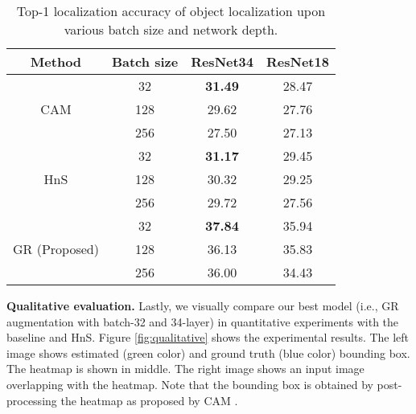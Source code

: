 \documentclass{bmvc2k}
\begin{document}
\begin{table}[t]
\centering
\begin{footnotesize}
\begin{tabular}{cc|cc}
\hline
Method                    & Batch size & ResNet34          & ResNet18          \\ \hline
\multirow{3}{*}{CAM \cite{zhou2016learning}} & 32         & \textbf{31.49}    & 28.47             \\
                          & 128        & 29.62             & 27.76             \\
                          & 256        & 27.50             & 27.13             \\ \hline
\multirow{3}{*}{HnS \cite{singh2017hide}} & 32         & \textbf{31.17}    & 29.45             \\
                          & 128        & 30.32             & 29.25             \\
                          & 256        & 29.72             & 27.56             \\ \hline
\multirow{3}{*}{GR (Proposed)}  & 32         & \textbf{37.84}    & 35.94             \\
                          & 128        & 36.13             & 35.83             \\
                          & 256        & 36.00             & 34.43             \\ \hline
\end{tabular}
\end{footnotesize}
\caption{Top-1 localization accuracy of object localization upon various batch size and network depth.}
\label{tab:learning}
\end{table}

\textbf{Qualitative evaluation.} Lastly, we visually compare our best model (i.e., GR augmentation with batch-32 and 34-layer) in quantitative experiments with the baseline and HnS. Figure \ref{fig:qualitative} shows the experimental results. The left image shows estimated (green color) and ground truth (blue color) bounding box. The heatmap is shown in middle. The right image shows an input image overlapping with the heatmap. Note that the bounding box is obtained by post-processing the heatmap as proposed by CAM \cite{zhou2016learning}.
\end{document}
